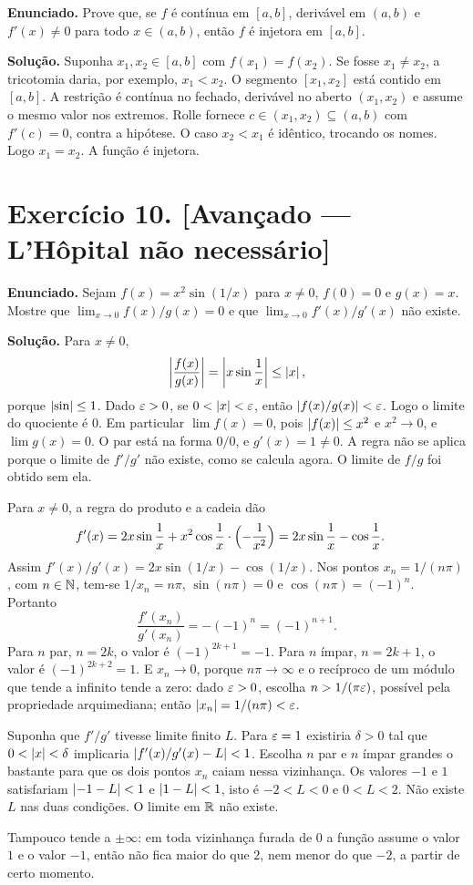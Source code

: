 \documentclass[11pt,a4paper]{article}
\begin{document}
\textbf{Enunciado.} Prove que, se $f$ é contínua em $[a,b]$, derivável em $(a,b)$ e $f'(x)\neq 0$ para todo $x\in(a,b)$, então $f$ é injetora em $[a,b]$.

\textbf{Solução.}
Suponha $x_1,x_2\in[a,b]$ com $f(x_1)=f(x_2)$. Se fosse $x_1\neq x_2$, a tricotomia daria, por exemplo, $x_1<x_2$. O segmento $[x_1,x_2]$ está contido em $[a,b]$. A restrição é contínua no fechado, derivável no aberto $(x_1,x_2)$ e assume o mesmo valor nos extremos. Rolle fornece $c\in(x_1,x_2)\subseteq(a,b)$ com $f'(c)=0$, contra a hipótese. O caso $x_2<x_1$ é idêntico, trocando os nomes. Logo $x_1=x_2$. A função é injetora.

\section*{Exercício 10. [Avançado --- L'Hôpital não necessário]}

\textbf{Enunciado.} Sejam $f(x)=x^2\sin(1/x)$ para $x\neq 0$, $f(0)=0$ e $g(x)=x$. Mostre que $\lim_{x\to 0}f(x)/g(x)=0$ e que $\lim_{x\to 0}f'(x)/g'(x)$ não existe.

\textbf{Solução.}
Para $x\neq 0$,
\[
\left\lvert \frac{f(x)}{g(x)} \right\rvert=\left\lvert x\sin\frac{1}{x} \right\rvert\le\left\lvert x \right\rvert,
\]
porque $\left\lvert \sin \right\rvert\le 1$. Dado $\varepsilon>0$, se $0<\left\lvert x \right\rvert<\varepsilon$, então $\left\lvert f(x)/g(x) \right\rvert<\varepsilon$. Logo o limite do quociente é $0$. Em particular $\lim f(x)=0$, pois $\left\lvert f(x) \right\rvert\le x^2$ e $x^2\to 0$, e $\lim g(x)=0$. O par está na forma $0/0$, e $g'(x)=1\neq 0$. A regra não se aplica porque o limite de $f'/g'$ não existe, como se calcula agora. O limite de $f/g$ foi obtido sem ela.

Para $x\neq 0$, a regra do produto e a cadeia dão
\begin{align*}
f'(x)
&=2x\sin\frac{1}{x}+x^2\cos\frac{1}{x}\cdot\Bigl(-\frac{1}{x^2}\Bigr)
=2x\sin\frac{1}{x}-\cos\frac{1}{x}.
\end{align*}
Assim $f'(x)/g'(x)=2x\sin(1/x)-\cos(1/x)$. Nos pontos $x_n=1/(n\pi)$, com $n\in\mathbb{N}$, tem-se $1/x_n=n\pi$, $\sin(n\pi)=0$ e $\cos(n\pi)=(-1)^n$. Portanto
\[
\frac{f'(x_n)}{g'(x_n)}=-(-1)^n=(-1)^{n+1}.
\]
Para $n$ par, $n=2k$, o valor é $(-1)^{2k+1}=-1$. Para $n$ ímpar, $n=2k+1$, o valor é $(-1)^{2k+2}=1$. E $x_n\to 0$, porque $n\pi\to\infty$ e o recíproco de um módulo que tende a infinito tende a zero: dado $\varepsilon>0$, escolha $n>1/(\pi\varepsilon)$, possível pela propriedade arquimediana; então $\left\lvert x_n \right\rvert=1/(n\pi)<\varepsilon$.

Suponha que $f'/g'$ tivesse limite finito $L$. Para $\varepsilon=1$ existiria $\delta>0$ tal que $0<\left\lvert x \right\rvert<\delta$ implicaria $\left\lvert f'(x)/g'(x)-L \right\rvert<1$. Escolha $n$ par e $n$ ímpar grandes o bastante para que os dois pontos $x_n$ caiam nessa vizinhança. Os valores $-1$ e $1$ satisfariam $\left\lvert -1-L \right\rvert<1$ e $\left\lvert 1-L \right\rvert<1$, isto é $-2<L<0$ e $0<L<2$. Não existe $L$ nas duas condições. O limite em $\mathbb{R}$ não existe.

Tampouco tende a $\pm\infty$: em toda vizinhança furada de $0$ a função assume o valor $1$ e o valor $-1$, então não fica maior do que $2$, nem menor do que $-2$, a partir de certo momento.
\end{document}
